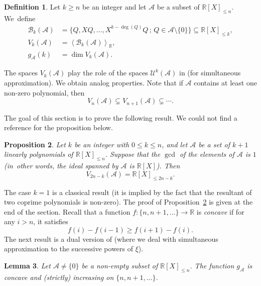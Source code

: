\documentclass[JEP,XML,SOM,Unicode,NoFloatCountersInSection,published]{cedram}
\newcommand\bR{\mathbb{R}}
\newcommand\cA{\mathcal{A}}
\newcommand\cB{\mathcal{B}}
\newcommand\cU{\mathcal{U}}
\newcommand{\Vect}[2][]{\left\la #2\right\ra_{#1}}
\let\subset \subseteq
\let\la\langle
\let\ra\rangle
\theoremstyle{definition}
\newtheorem{Def}{Definition}[section]
\theoremstyle{plain}
\newtheorem{Prop}[Def]{Proposition}
\newtheorem{Lem}[Def]{Lemma}
\begin{document}
\begin{Def}
\label{Def: fonction g_A(N)}
Let $k\geq n$ be an integer and let $\cA$ be a subset of $\bR[X]_{\leq n}$. We~define
\begin{align*}
\cB_k(\cA) &= \big\{ Q, XQ,\dots, X^{k-\deg(Q)}Q \,;\, Q\in\cA\setminus\{0\} \big\} \subset \bR[X]_{\leq k}, \\
V_k(\cA) &= \Vect[\bR]{\cB_k(\cA)}, \\
g_\cA(k) &= \dim V_k(\cA).
\end{align*}
\end{Def}

The spaces $V_k(\cA)$ play the role of the spaces $\cU^{k}(\cA)$ in \cite[\S3]{poels2022simultaneous} (for simultaneous approximation). We obtain analog properties. Note that if $\cA$ contains at least one non-zero polynomial, then
\begin{equation}
\label{eq: suite V_k(A) strict. croissante}
V_n(\cA) \varsubsetneq V_{n+1}(\cA) \varsubsetneq\cdots.
\end{equation}

The goal of this section is to prove the following result. We could not find a reference for the proposition below.

\begin{Prop}
\label{Cor: V_2n-k = tout l'espace}
Let $k$ be an integer with $0\leq k \leq n$, and let $\cA$ be a set of $k+1$ linearly polynomials of $\bR[X]_{\leq n}$. Suppose that the $\gcd$ of the elements of $\cA$ is $1$ (in~other words, the ideal spanned by $\cA$ is $\bR[X]$). Then
\begin{equation}
\label{Cor: V_N = tout l'espace}
V_{2n-k}(\cA) = \bR[X]_{\leq 2n-k}.
\end{equation}
\end{Prop}

The case $k=1$ is a classical result (it is implied by the fact that the resultant of two coprime polynomials is non-zero). The proof of Proposition~\ref{Cor: V_2n-k = tout l'espace} is given at the end of the section. Recall that a function $f : \{n,n+1, \ldots \} \to \bR$ is \emph{concave} if for any $i > n$, it satisfies
\[
f(i)-f(i-1) \geq f(i+1)-f(i).
\]
The next result is a dual version of \cite[Prop.\,3.1]{poels2022simultaneous} (where we deal with simultaneous approximation to the successive powers of $\xi$).

\begin{Lem}
Let $\cA \neq \{0\}$ be a non-empty subset of $\bR[X]_{\leq n}$. The function $g_\cA$ is concave and (strictly) increasing on $\{n,n+1,\ldots\}$.
\end{Lem}
\end{document}
